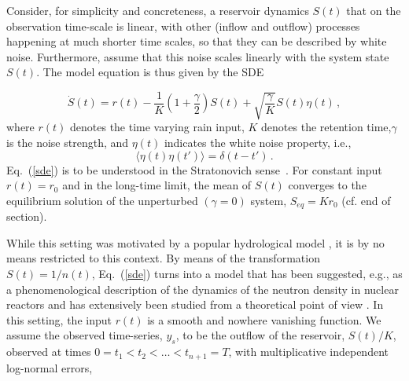 \documentclass[11pt]{article}
\theoremstyle{definition}
\begin{document}
Consider, for simplicity and concreteness, a reservoir dynamics $S(t)$ that on the observation time-scale is linear, with other (inflow and outflow) processes happening at much shorter time scales, so that they can be described by white noise. Furthermore, assume that this noise scales linearly with the system state $S(t)$. The model equation is thus given by the SDE

\begin{equation}\label{sde}
\dot{S}(t) = r(t) - \frac{1}{K}\left(1+\frac{\gamma}{2}\right) S(t)
+
\sqrt{\frac{\gamma}{K}} S(t){\eta}(t)\,,
\end{equation}
where $r(t)$ denotes the time varying rain input, $K$ denotes the retention time,$\gamma$ is the noise strength, and $\eta(t)$ indicates the white noise property, i.e.,
\begin{equation}\label{whitenoise}
\langle\eta(t)\eta(t')\rangle = \delta(t-t')\,.
\end{equation}
Eq.~(\ref{sde}) is to be understood in the Stratonovich sense~\cite{stratonovich_1968}.
For constant input $r(t) = r_0$ and in the long-time limit, the mean of $S(t)$ converges to the equilibrium solution of the unperturbed $(\gamma = 0)$ system, $S_{eq} = Kr_{0}$ (cf. end of section).



While this setting was motivated by a popular hydrological model \cite{breinholt_2011_SDE, livina_2003_dischargeFluctuations}, it is by no means restricted to this context. By means of the transformation $S(t) = 1/n(t)$, Eq.~(\ref{sde}) turns into a model that has been suggested, e.g., as a phenomenological description of the dynamics of the neutron density in nuclear reactors \cite{dutre_1977_SDE} and has extensively been studied from a theoretical point of view \cite{schenzle_1979_multStochProc, fujisaka_1986_intermittency}.
In this setting, the input $r(t)$ is a smooth and nowhere vanishing function. We assume the observed time-series, $y_s$, to be the outflow of the reservoir, $S(t)/K$, observed at times $0=t_1<t_2<\dots < t_{n+1}=T$, with multiplicative independent log-normal errors,
\end{document}
